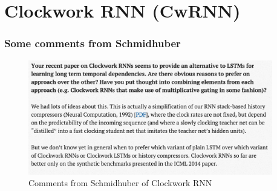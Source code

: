 \documentclass{beamer}
\begin{document}
\section{Clockwork RNN (CwRNN)}
\frame
{
   \frametitle{Some comments from Schmidhuber}
   \begin{figure}[ht]  
		\begin{center}
			\includegraphics[width=4.2in]{Images/comment_cwrnn.png}   
		\end{center}   
		\caption{Comments from Schmidhuber of Clockwork RNN}
	\end{figure}
}
\end{document}
